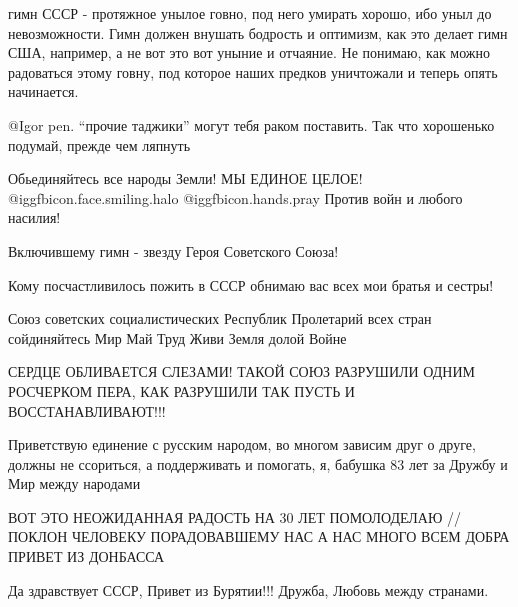 \begin{itemize}
\begin{itemize}

гимн СССР - протяжное унылое говно, под него умирать хорошо, ибо уныл до
невозможности. Гимн должен внушать бодрость и оптимизм, как это делает гимн
США, например, а не вот это вот уныние и отчаяние. Не понимаю, как можно
радоваться этому говну, под которое наших предков уничтожали и теперь опять
начинается.


@Igor pen.  \enquote{прочие таджики} могут тебя раком поставить. Так что
хорошенько подумай, прежде чем ляпнуть 

\end{itemize} %

Обьединяйтесь все народы Земли! МЫ  ЕДИНОЕ ЦЕЛОЕ!
 @igg{fbicon.face.smiling.halo}  @igg{fbicon.hands.pray} 
Против войн и любого насилия! 

Включившему гимн - звезду Героя Советского Союза!

Кому посчастливилось пожить в СССР обнимаю вас всех мои братья и сестры!


Союз советских социалистических Республик Пролетарий всех стран сойдиняйтесь
Мир Май Труд Живи Земля долой Войне


СЕРДЦЕ ОБЛИВАЕТСЯ СЛЕЗАМИ! ТАКОЙ СОЮЗ РАЗРУШИЛИ ОДНИМ РОСЧЕРКОМ ПЕРА, КАК
РАЗРУШИЛИ ТАК ПУСТЬ И ВОССТАНАВЛИВАЮТ!!! 


Приветствую единение с русским народом, во многом зависим друг о друге, должны не
ссориться, а поддерживать и помогать, я, бабушка 83 лет за Дружбу и Мир между
народами


ВОТ ЭТО НЕОЖИДАННАЯ РАДОСТЬ НА 30 ЛЕТ ПОМОЛОДЕЛАЮ // ПОКЛОН ЧЕЛОВЕКУ
ПОРАДОВАВШЕМУ НАС А НАС МНОГО ВСЕМ ДОБРА  ПРИВЕТ ИЗ ДОНБАССА


Да здравствует СССР, Привет из Бурятии!!! Дружба, Любовь между странами. 

\end{itemize} %
